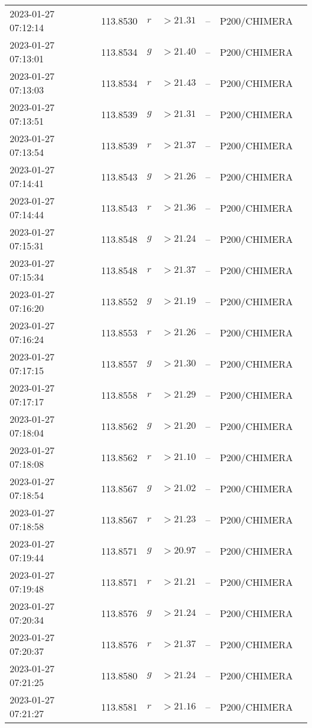 \documentclass{nature_plusfigure}
\begin{document}
\begin{supplement}
\begin{center}
\begin{longtable}{lllllll}
2023-01-27 07:12:14 & 113.8530 & $r$ & $>21.31$ & -- & P200/CHIMERA &  \\ 
2023-01-27 07:13:01 & 113.8534 & $g$ & $>21.40$ & -- & P200/CHIMERA &  \\ 
2023-01-27 07:13:03 & 113.8534 & $r$ & $>21.43$ & -- & P200/CHIMERA &  \\ 
2023-01-27 07:13:51 & 113.8539 & $g$ & $>21.31$ & -- & P200/CHIMERA &  \\ 
2023-01-27 07:13:54 & 113.8539 & $r$ & $>21.37$ & -- & P200/CHIMERA &  \\ 
2023-01-27 07:14:41 & 113.8543 & $g$ & $>21.26$ & -- & P200/CHIMERA &  \\ 
2023-01-27 07:14:44 & 113.8543 & $r$ & $>21.36$ & -- & P200/CHIMERA &  \\ 
2023-01-27 07:15:31 & 113.8548 & $g$ & $>21.24$ & -- & P200/CHIMERA &  \\ 
2023-01-27 07:15:34 & 113.8548 & $r$ & $>21.37$ & -- & P200/CHIMERA &  \\ 
2023-01-27 07:16:20 & 113.8552 & $g$ & $>21.19$ & -- & P200/CHIMERA &  \\ 
2023-01-27 07:16:24 & 113.8553 & $r$ & $>21.26$ & -- & P200/CHIMERA &  \\ 
2023-01-27 07:17:15 & 113.8557 & $g$ & $>21.30$ & -- & P200/CHIMERA &  \\ 
2023-01-27 07:17:17 & 113.8558 & $r$ & $>21.29$ & -- & P200/CHIMERA &  \\ 
2023-01-27 07:18:04 & 113.8562 & $g$ & $>21.20$ & -- & P200/CHIMERA &  \\ 
2023-01-27 07:18:08 & 113.8562 & $r$ & $>21.10$ & -- & P200/CHIMERA &  \\ 
2023-01-27 07:18:54 & 113.8567 & $g$ & $>21.02$ & -- & P200/CHIMERA &  \\ 
2023-01-27 07:18:58 & 113.8567 & $r$ & $>21.23$ & -- & P200/CHIMERA &  \\ 
2023-01-27 07:19:44 & 113.8571 & $g$ & $>20.97$ & -- & P200/CHIMERA &  \\ 
2023-01-27 07:19:48 & 113.8571 & $r$ & $>21.21$ & -- & P200/CHIMERA &  \\ 
2023-01-27 07:20:34 & 113.8576 & $g$ & $>21.24$ & -- & P200/CHIMERA &  \\ 
2023-01-27 07:20:37 & 113.8576 & $r$ & $>21.37$ & -- & P200/CHIMERA &  \\ 
2023-01-27 07:21:25 & 113.8580 & $g$ & $>21.24$ & -- & P200/CHIMERA &  \\ 
2023-01-27 07:21:27 & 113.8581 & $r$ & $>21.16$ & -- & P200/CHIMERA &  \\ 

\end{longtable}
\end{center}
\end{supplement}
\end{document}
